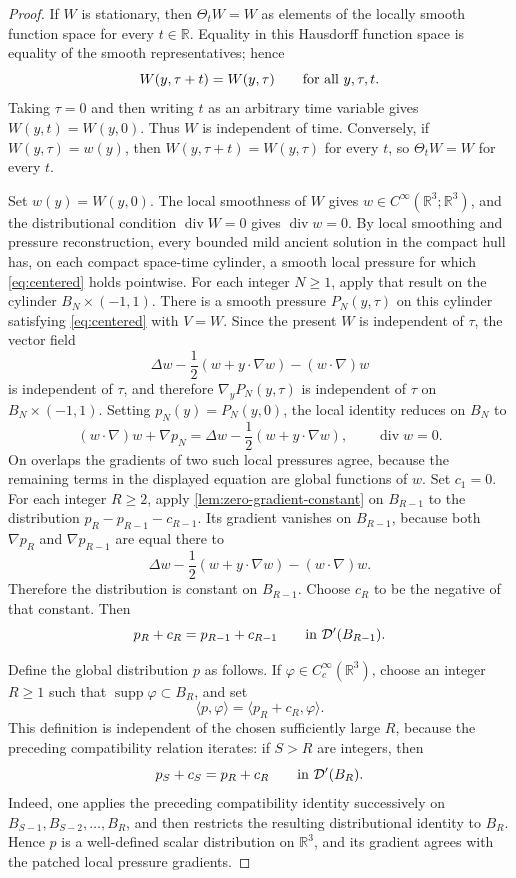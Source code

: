 \documentclass[11pt]{amsart}
\theoremstyle{plain}
\theoremstyle{definition}
\theoremstyle{remark}
\numberwithin{equation}{section}
\begin{document}
\begin{proof}
If \(W\) is stationary, then \(\Theta_tW=W\) as elements of the locally smooth
function space for every \(t\in\mathbb R\).  Equality in this Hausdorff
function space is equality of the smooth representatives; hence
\[
   W(y,\tau+t)=W(y,\tau)
   \qquad\hbox{for all }y,\tau,t .
\]
Taking \(\tau=0\) and then writing \(t\) as an arbitrary time variable gives
\(W(y,t)=W(y,0)\).  Thus \(W\) is independent of time.  Conversely, if
\(W(y,\tau)=w(y)\), then \(W(y,\tau+t)=W(y,\tau)\) for every \(t\), so
\(\Theta_tW=W\) for every \(t\).

Set \(w(y)=W(y,0)\).  The local smoothness of \(W\) gives
\(w\in C^\infty(\mathbb R^3;\mathbb R^3)\), and the distributional condition
\(\operatorname{div}W=0\) gives \(\operatorname{div}w=0\).  By local smoothing
and pressure reconstruction, every bounded mild ancient solution in the compact
hull has, on each compact space-time cylinder, a smooth local pressure for
which \eqref{eq:centered} holds pointwise.  For each integer \(N\ge1\), apply
that result on the cylinder \(B_N\times(-1,1)\).  There is a smooth pressure
\(P_N(y,\tau)\) on this cylinder satisfying \eqref{eq:centered} with
\(V=W\).  Since the present
\(W\) is independent of \(\tau\), the vector field
\[
   \Delta w-\frac12(w+y\cdot\nabla w)-(w\cdot\nabla)w
\]
is independent of \(\tau\), and therefore \(\nabla_yP_N(y,\tau)\) is
independent of \(\tau\) on \(B_N\times(-1,1)\).  Setting
\(p_N(y)=P_N(y,0)\), the local identity reduces on \(B_N\) to
\[
   (w\cdot\nabla)w+\nabla p_N
   =
   \Delta w-\frac12(w+y\cdot\nabla w),
   \qquad \operatorname{div}w=0 .
\]
On overlaps the gradients of two such local pressures agree, because the
remaining terms in the displayed equation are global functions of \(w\).
Set \(c_1=0\).  For each integer \(R\ge2\), apply
\cref{lem:zero-gradient-constant} on
\(B_{R-1}\) to the distribution \(p_R-p_{R-1}-c_{R-1}\).  Its gradient
vanishes on \(B_{R-1}\), because both \(\nabla p_R\) and
\(\nabla p_{R-1}\) are equal there to
\[
   \Delta w-\frac12(w+y\cdot\nabla w)-(w\cdot\nabla)w .
\]
Therefore the distribution is constant on \(B_{R-1}\).
Choose \(c_R\) to be the negative of that constant.  Then
\[
   p_R+c_R=p_{R-1}+c_{R-1}
   \qquad\hbox{in }\mathcal D'(B_{R-1}) .
\]

Define the global distribution \(p\) as follows.  If
\(\varphi\in C_c^\infty(\mathbb R^3)\), choose an integer \(R\ge1\) such that
\(\operatorname{supp}\varphi\subset B_R\), and set
\[
   \langle p,\varphi\rangle
   =
   \langle p_R+c_R,\varphi\rangle .
\]
This definition is independent of the chosen sufficiently large \(R\), because
the preceding compatibility relation iterates: if \(S>R\) are integers, then
\[
   p_S+c_S=p_R+c_R
   \qquad\hbox{in }\mathcal D'(B_R).
\]
Indeed, one applies the preceding compatibility identity successively on
\(B_{S-1},B_{S-2},\ldots,B_R\), and then restricts the resulting distributional
identity to \(B_R\).
Hence \(p\) is a well-defined scalar distribution on \(\mathbb R^3\), and its
gradient agrees with the patched local pressure gradients.


\end{proof}
\end{document}
